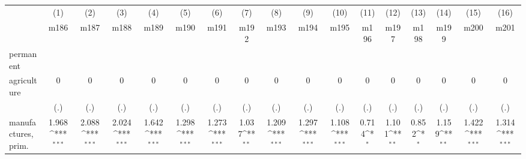 {
\def\sym#1{\ifmmode^{#1}\else\(^{#1}\)\fi}
\begin{tabular}{l*{16}{c}}
\hline\hline
                    &\multicolumn{1}{c}{(1)}&\multicolumn{1}{c}{(2)}&\multicolumn{1}{c}{(3)}&\multicolumn{1}{c}{(4)}&\multicolumn{1}{c}{(5)}&\multicolumn{1}{c}{(6)}&\multicolumn{1}{c}{(7)}&\multicolumn{1}{c}{(8)}&\multicolumn{1}{c}{(9)}&\multicolumn{1}{c}{(10)}&\multicolumn{1}{c}{(11)}&\multicolumn{1}{c}{(12)}&\multicolumn{1}{c}{(13)}&\multicolumn{1}{c}{(14)}&\multicolumn{1}{c}{(15)}&\multicolumn{1}{c}{(16)}\\
                    &\multicolumn{1}{c}{m186}&\multicolumn{1}{c}{m187}&\multicolumn{1}{c}{m188}&\multicolumn{1}{c}{m189}&\multicolumn{1}{c}{m190}&\multicolumn{1}{c}{m191}&\multicolumn{1}{c}{m192}&\multicolumn{1}{c}{m193}&\multicolumn{1}{c}{m194}&\multicolumn{1}{c}{m195}&\multicolumn{1}{c}{m196}&\multicolumn{1}{c}{m197}&\multicolumn{1}{c}{m198}&\multicolumn{1}{c}{m199}&\multicolumn{1}{c}{m200}&\multicolumn{1}{c}{m201}\\
\hline
permanent           &                     &                     &                     &                     &                     &                     &                     &                     &                     &                     &                     &                     &                     &                     &                     &                     \\
agriculture         &           0         &           0         &           0         &           0         &           0         &           0         &           0         &           0         &           0         &           0         &           0         &           0         &           0         &           0         &           0         &           0         \\
                    &         (.)         &         (.)         &         (.)         &         (.)         &         (.)         &         (.)         &         (.)         &         (.)         &         (.)         &         (.)         &         (.)         &         (.)         &         (.)         &         (.)         &         (.)         &         (.)         \\
[1em]
manufactures, prim. &       1.968\sym{***}&       2.088\sym{***}&       2.024\sym{***}&       1.642\sym{***}&       1.298\sym{***}&       1.273\sym{***}&       1.037\sym{**} &       1.209\sym{***}&       1.297\sym{***}&       1.108\sym{***}&       0.714\sym{*}  &       1.101\sym{**} &       0.852\sym{*}  &       1.159\sym{**} &       1.422\sym{***}&       1.314\sym{***}\\

\end{tabular}}
